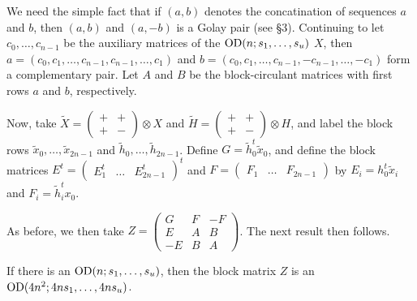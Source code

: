 \documentclass[../../../main]{subfiles}
\begin{document}
 We need the simple fact that if $(a,b)$ denotes the concatination of sequences $a$ and $b$, then $(a,b)$ and $(a,-b)$ is a Golay pair (see \S3). Continuing to let $c_0, \dots, c_{n-1}$ be the auxiliary matrices of the $\text{OD}(n; s_1, \dots, s_u)$ $X$, then $a=(c_0,c_1, \dots, c_{n-1},c_{n-1},\dots,c_1)$ and $b=(c_0,c_1, \dots, c_{n-1},-c_{n-1},\dots,-c_1)$ form a complementary pair. Let $A$ and $B$ be the block-circulant matrices with first rows $a$ and $b$, respectively. 
 
 Now, take $\tilde X = \left(\begin{smallmatrix} +&+\\+&- \end{smallmatrix}\right) \otimes X$ and $\tilde H = \left(\begin{smallmatrix} +&+\\+&- \end{smallmatrix}\right) \otimes H$, and label the block rows $\tilde x_0, \dots, \tilde x_{2n-1}$ and $\tilde h_0, \dots, \tilde h_{2n-1}$. Define $G=\tilde h_0^t \tilde x_0$, and define the block matrices $E^t=(\begin{smallmatrix} E_1^t & \dots & E_{2n-1}^t \end{smallmatrix})^t$ and $F=(\begin{smallmatrix} F_1 & \dots & F_{2n-1} \end{smallmatrix})$ by $E_i=h_0^t\tilde x_i$ and $F_i=\tilde h_i^t x_0$.
 
 As before, we then take $Z=\left(\begin{smallmatrix} G&F&-F\\E&A&B\\-E&B&A \end{smallmatrix}\right)$. The next result then follows.
 
 \begin{thm}\label{stable-od-thm}
  If there is an $\text{OD}(n;s_1, \dots, s_u)$, then the block matrix $Z$ is an $\text{OD}(4n^2; 4ns_1, \dots, 4ns_u)$. 
 \end{thm}
 
\end{document}

